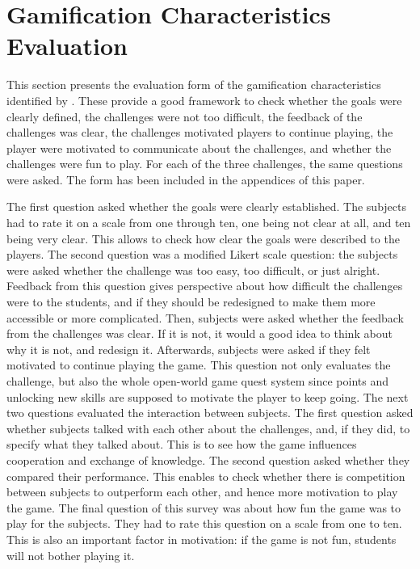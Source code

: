 \documentclass{l4proj}
\begin{document}
\section{Gamification Characteristics Evaluation}

This section presents the evaluation form of the gamification characteristics identified by \citet{cugelman_gamification:_2013}.
These provide a good framework to check whether the goals were clearly defined, the challenges were not too difficult,
the feedback of the challenges was clear, the challenges motivated players to continue playing, 
the player were motivated to communicate about the challenges, and whether the challenges were fun to play.
For each of the three challenges, the same questions were asked.
The form has been included in the appendices of this paper.

The first question asked whether the goals were clearly established. 
The subjects had to rate it on a scale from one through ten, one being not clear at all, and ten being very clear.
This allows to check how clear the goals were described to the players.
The second question was a modified Likert scale question: 
the subjects were asked whether the challenge was too easy, too difficult, or just alright.
Feedback from this question gives perspective about how difficult the challenges were to the students,
and if they should be redesigned to make them more accessible or more complicated.
Then, subjects were asked whether the feedback from the challenges was clear. 
If it is not, it would a good idea to think about why it is not, and redesign it.
Afterwards, subjects were asked if they felt motivated to continue playing the game.
This question not only evaluates the challenge, but also the whole open-world game quest system since 
points and unlocking new skills are supposed to motivate the player to keep going.
The next two questions evaluated the interaction between subjects.
The first question asked whether subjects talked with each other about the challenges, and, if they did, 
to specify what they talked about. This is to see how the game influences cooperation and exchange of knowledge.
The second question asked whether they compared their performance. 
This enables to check whether there is competition between subjects to outperform each other, 
and hence more motivation to play the game.
The final question of this survey was about how fun the game was to play for the subjects.
They had to rate this question on a scale from one to ten. 
This is also an important factor in motivation: if the game is not fun, students will not bother playing it.
\end{document}
